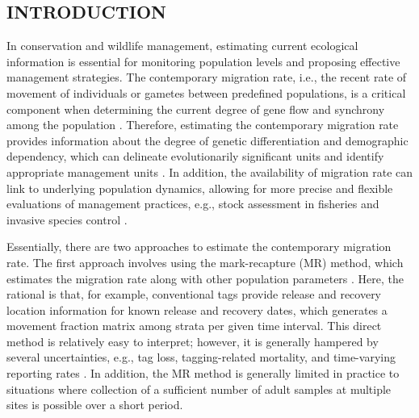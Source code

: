 \documentclass[12pt, English]{article}
\begin{document}
\pagebreak
\begin{spacing}{1.9}
\newcommand{\NeNbias}{S1}

\newcommand{\Nebias}{S2}

\newcommand{\Ninvbias}{S3}

\newcommand{\NeNcv}{S4}

\newcommand{\Necv}{S5}

\newcommand{\Ninvcv}{S6}

\section{INTRODUCTION}


In conservation and wildlife management, estimating current ecological information is essential for monitoring population levels and proposing effective management strategies. The contemporary migration rate, i.e., the recent rate of movement of individuals or gametes between predefined populations, is a critical component when determining the current degree of gene flow and synchrony among the population \cite[]{Waples_2006_MolEcol, https://doi.org/10.1111/j.1365-294X.2010.04688.x}. Therefore, estimating the contemporary migration rate provides information about the degree of genetic differentiation and demographic dependency, which can delineate evolutionarily significant units and identify appropriate management units \cite[]{moritz1994defining, PALSBOLL200711}. In addition, the availability of migration rate can link to underlying population dynamics, allowing for more precise and flexible evaluations of management practices, e.g., stock assessment in fisheries \cite[]{hampton2001spatially} and invasive species control \cite[]{doi:10.1146/annurev.ecolsys.32.081501.114037}. 


Essentially, there are two approaches to estimate the contemporary migration rate. The first approach involves using the mark-recapture (MR) method, which estimates the migration rate along with other population parameters \cite[]{kery2011bayesian, Thorson_2021}. Here, the rational is that, for example, conventional tags provide release and recovery location information for known release and recovery dates, which generates a movement fraction matrix among strata per given time interval. This direct method is relatively easy to interpret; however, it is generally hampered by several uncertainties, e.g., tag loss, tagging-related mortality, and time-varying reporting rates \cite[]{hilborn2013quantitative}. In addition, the MR method is generally limited in practice to situations where collection of a sufficient number of adult samples at multiple sites is possible over a short period. 


\end{spacing}
\end{document}
